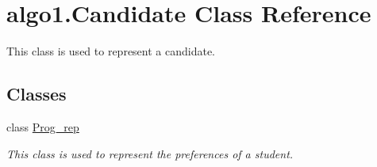 \hypertarget{classalgo1_1_1Candidate}{\section{algo1.\+Candidate Class Reference}
\label{classalgo1_1_1Candidate}
}


This class is used to represent a candidate.  


\subsection*{Classes}
\begin{DoxyCompactItemize}
\item 
class \hyperlink{classalgo1_1_1Candidate_1_1Prog__rep}{Prog\+\_\+rep}
\begin{DoxyCompactList}\small\item\em This class is used to represent the preferences of a student. \end{DoxyCompactList}\end{DoxyCompactItemize}
